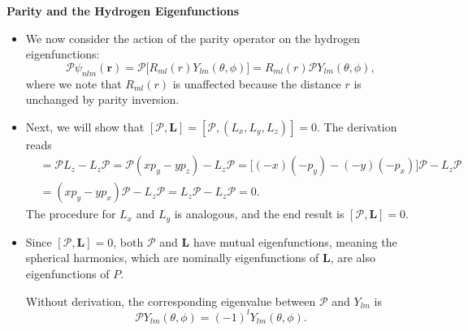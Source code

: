 \documentclass[11pt, a4paper]{article}
\renewcommand{\vec}[1]{\bm{#1}} %
\newcommand{\p}{\psi}  %
\renewcommand{\r}{\vec{r}}  %
\renewcommand{\P}{\mathcal{P}}  %
\begin{document}
\textbf{Parity and the Hydrogen Eigenfunctions}
\begin{itemize}
	\item We now consider the action of the parity operator on the hydrogen eigenfunctions:
	\begin{equation*}
		\P\p_{nlm}(\r) = \P\big[R_{ml}(r)Y_{lm}(\theta, \phi)\big] = R_{ml}(r) \P Y_{lm}(\theta, \phi),
	\end{equation*}
	where we note that $ R_{ml}(r) $ is unaffected because the distance $ r $ is unchanged by parity inversion.
	
	\item Next, we will show that $ [\P, \vec{L}] = [\P, (L_{x}, L_{y}, L_{z})] = 0 $. The derivation reads
	\begin{align*}
		[\P, L_{z}] &= \P L_{z} - L_{z}\P = \P(xp_{y} - yp_{z}) - L_{z}\P = \big[(-x)(-p_{y}) - (-y)(-p_{x})\big]\P - L_{z}\P\\
		& = (xp_{y} - yp_{x})\P - L_{z}\P = L_{z}\P - L_{z}\P = 0.
	\end{align*}
	The procedure for  $ L_{x} $ and $ L_{y} $ is analogous, and the end result is $ [\P, \vec{L}] = 0 $. 
	
	\item Since $ [\P, \vec{L}] = 0 $, both $ \P $ and $ \vec{L} $ have mutual eigenfunctions, meaning the spherical harmonics, which are nominally eigenfunctions of $ \vec{L} $, are also eigenfunctions of $ P $. 
	
	Without derivation, the corresponding eigenvalue between $ \P $ and $ Y_{lm} $ is
	\begin{equation*}
		\P Y_{lm}(\theta, \phi) = (-1)^{l}Y_{lm}(\theta, \phi).
	\end{equation*}
\end{itemize}
\end{document}
